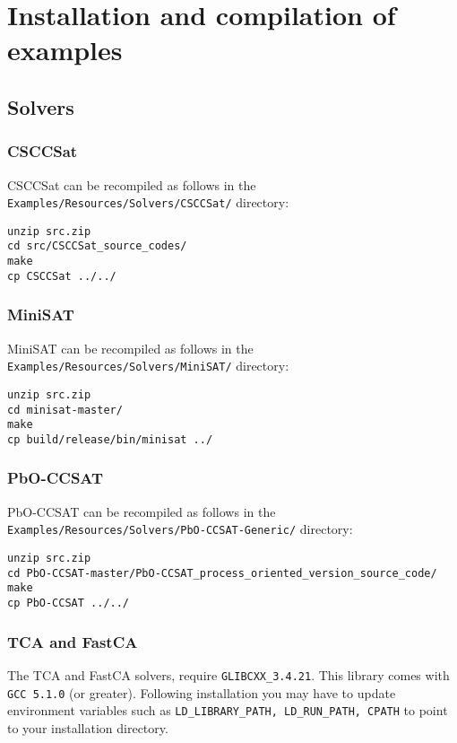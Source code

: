 \documentclass{article}
\begin{document}
\section{Installation and compilation of examples}

\subsection{Solvers}

\subsubsection{CSCCSat}
CSCCSat can be recompiled as follows in the \texttt{Examples/Resources/Solvers/CSCCSat/} directory:
\begin{Verbatim}[frame=single]
unzip src.zip
cd src/CSCCSat_source_codes/
make
cp CSCCSat ../../
\end{Verbatim}

\subsubsection{MiniSAT}
MiniSAT can be recompiled as follows in the \texttt{Examples/Resources/Solvers/MiniSAT/} directory:
\begin{Verbatim}[frame=single]
unzip src.zip
cd minisat-master/
make
cp build/release/bin/minisat ../
\end{Verbatim}

\subsubsection{PbO-CCSAT}
PbO-CCSAT can be recompiled as follows in the \texttt{Examples/Resources/Solvers/PbO-CCSAT-Generic/} directory:
\begin{Verbatim}[frame=single]
unzip src.zip
cd PbO-CCSAT-master/PbO-CCSAT_process_oriented_version_source_code/
make
cp PbO-CCSAT ../../
\end{Verbatim}

\subsubsection{TCA and FastCA}
The TCA and FastCA solvers, require \texttt{GLIBCXX\_3.4.21}. This library comes with \texttt{GCC 5.1.0} (or greater). Following installation you may have to update environment variables such as \texttt{LD\_LIBRARY\_PATH, LD\_RUN\_PATH, CPATH} to point to your installation directory.
\end{document}
